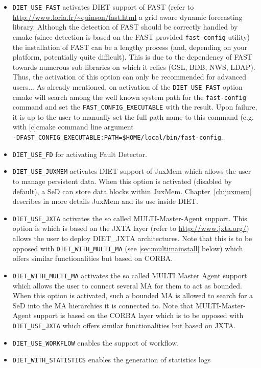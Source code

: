 \begin{itemize}
\item
  \verb+DIET_USE_FAST+ activates DIET support of FAST (refer to
  \url{http://www.loria.fr/~quinson/fast.html} a grid aware dynamic
  forecasting library.
  Although the detection of FAST should be correctly handled by cmake
  (since detection is based on the FAST provided \verb+fast-config+ utility)
  the installation of FAST can be a lengthy process (and, depending on your
  platform, potentially quite difficult).
  This is due to the dependency of FAST towards numerous sub-libraries on
  which it relies (GSL, BDB, NWS, LDAP).
  Thus, the activation of this option can only be recommended for advanced
  users...
  As already mentioned, on activation of the \verb+DIET_USE_FAST+ option
  cmake will search among the well known system path for the
  \verb+fast-config+ command and set the \verb+FAST_CONFIG_EXECUTABLE+ 
  with the result. Upon failure, it is up to the user to manually set the
  full path name to this command (e.g. with [c]cmake command line argument \\
  \verb+-DFAST_CONFIG_EXECUTABLE:PATH=$HOME/local/bin/fast-config+.

\item
  \verb+DIET_USE_FD+ for activating Fault Detector.

\item 
  \verb+DIET_USE_JUXMEM+ activates DIET support of JuxMem which allows
  the user to manage persistent data.
  When this option is activated (disabled by default), a SeD can store
  data blocks within JuxMem.
  Chapter~\ref{ch:juxmem} describes in more details JuxMem and its use
  inside DIET.

\item
  \verb+DIET_USE_JXTA+ activates the so called MULTI-Master-Agent
  support.
  This option is which is based on the JXTA layer (refer to
  \url{http://www.jxta.org/}) allows the user to deploy DIET\_JXTA
  architectures.
  Note that this is to be opposed with
  \verb+DIET_WITH_MULTI_MA+ (see \ref{sec:multimainstall} below)
  which offers similar functionalities but based on CORBA.

\item
  \label{sec:multimainstall}
  \verb+DIET_WITH_MULTI_MA+ activates the so called MULTI Master Agent
  support which allows the user to connect several MA for them to
  act as bounded.
  When this option is activated, such a bounded MA is allowed to search
  for a SeD into the MA hierarchies it is connected to.
  Note that MULTI-Master-Agent support is based on the CORBA layer
  which is to be opposed with \verb+DIET_USE_JXTA+ which offers similar
  functionalities but based on JXTA.

\item
  \verb+DIET_USE_WORKFLOW+ enables the support of workflow.

\item
  \verb+DIET_WITH_STATISTICS+ enables the generation of statistics logs
\end{itemize}

